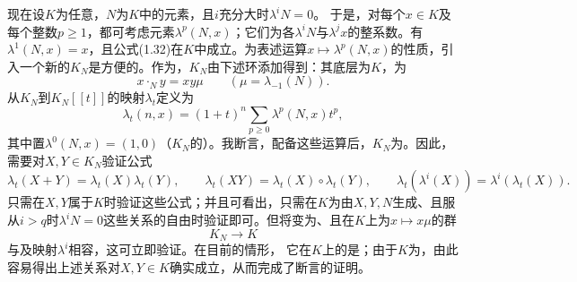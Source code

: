 现在设$K$为任意，$N$为$K$中的元素，且$i$充分大时$\lambda^iN=0$。
于是，对每个$x\in K$及每个整数$p\geq1$，都可考虑元素$\lambda^p(N,x)$；它们为各$\lambda^iN$与$\lambda^jx$的整系数。有$\lambda^1(N,x)=x$，且公式(1.32)在$K$中成立。为表述运算$x\mapsto\lambda^p(N,x)$的性质，引入一个新的$K_N$是方便的。作为，$K_N$由下述环添加得到：其底层为$K$，为
\begin{equation}x\mathbin{\cdot_N}y=xy\mu\qquad(\mu=\lambda_{-1}(N)).\tag{1.34}\end{equation}
从$K_N$到$K_N[[t]]$的映射$\lambda_t$定义为
\begin{equation}\lambda_t(n,x)=(1+t)^n\sum_{p\geq0}\lambda^p(N,x)t^p,\tag{1.35}\end{equation}
其中置$\lambda^0(N,x)=(1,0)$（$K_N$的）。我断言，配备这些运算后，$K_N$为。因此，需要对$X,Y\in K_N$验证公式
\[\lambda_t(X+Y)=\lambda_t(X)\lambda_t(Y),\qquad
\lambda_t(XY)=\lambda_t(X)\circ\lambda_t(Y),\qquad
\lambda_t(\lambda^i(X))=\lambda^i(\lambda_t(X)).\]
只需在$X,Y$属于$K$时验证这些公式；并且可看出，只需在$K$为由$X,Y,N$生成、且服从$i>q$时$\lambda^iN=0$这些关系的自由时验证即可。但将变为、且在$K$上为$x\mapsto x\mu$的群
\begin{equation}K_N\longrightarrow K\tag{1.36}\end{equation}
与及映射$\lambda^i$相容，这可立即验证。在目前的情形，
它在$K$上的是；由于$K$为，由此容易得出上述关系对$X,Y\in K$确实成立，从而完成了断言的证明。

